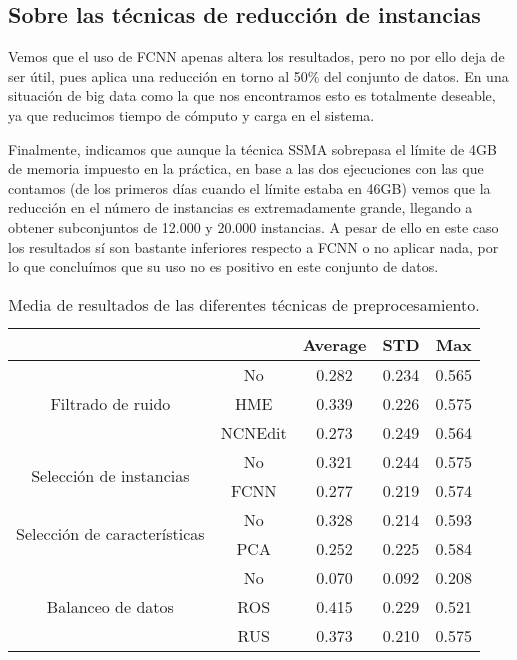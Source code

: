 \subsection{Sobre las técnicas de reducción de instancias}

Vemos que el uso de FCNN apenas altera los resultados, pero no por ello deja de ser útil, pues aplica una reducción en torno al 50\% del conjunto de datos. En una situación de big data como la que nos encontramos esto es totalmente deseable, ya que reducimos tiempo de cómputo y carga en el sistema.

\vspace{\baselineskip}

Finalmente, indicamos que aunque la técnica SSMA sobrepasa el límite de 4GB de memoria impuesto en la práctica, en base a las dos ejecuciones con las que contamos (de los primeros días cuando el límite estaba en 46GB) vemos que la reducción en el número de instancias es extremadamente grande, llegando a obtener subconjuntos de 12.000 y 20.000 instancias.
A pesar de ello en este caso los resultados sí son bastante inferiores respecto a FCNN o no aplicar nada, por lo que concluímos que su uso no es positivo en este conjunto de datos.

\begin{table}
    \centering
    \begin{tabular}{cc|c|c|c|}
    \cline{3-5}
    \multicolumn{1}{l}{\textbf{}} & \textbf{} & \multicolumn{1}{c|}{\textbf{Average}} & \multicolumn{1}{c|}{\textbf{STD}} & \textbf{Max} \\ \hline
    \multicolumn{1}{|c|}{\multirow{3}{*}{Filtrado de ruido}}       & No        & 0.282  & 0.234
    & 0.565    \\ \cline{2-5} 
    \multicolumn{1}{|c|}{}  & HME       & 0.339   & 0.226    & 0.575        \\ \cline{2-5} 
    \multicolumn{1}{|c|}{}  & NCNEdit   & 0.273   & 0.249    & 0.564        \\ \hline
    \multicolumn{1}{|c|}{\multirow{2}{*}{Selección de instancias}} & No        & 0.321  & 0.244    & 0.575        \\ \cline{2-5} 
    \multicolumn{1}{|c|}{}  & FCNN      & 0.277   & 0.219    & 0.574        \\ \hline
    \multicolumn{1}{|c|}{\multirow{2}{*}{Selección de características}} & No        & 0.328  & 0.214    & 0.593        \\ \cline{2-5} 
    \multicolumn{1}{|c|}{}  & PCA      & 0.252    & 0.225    & 0.584        \\ \hline
    \multicolumn{1}{|c|}{\multirow{3}{*}{Balanceo de datos}}       & No        & 0.070  & 0.092    & 0.208        \\ \cline{2-5} 
    \multicolumn{1}{|c|}{}  & ROS       & 0.415   & 0.229    & 0.521        \\ \cline{2-5} 
    \multicolumn{1}{|c|}{}  & RUS       & 0.373   & 0.210    & 0.575        \\ \hline
    \end{tabular}
    \caption{Media de resultados de las diferentes técnicas de preprocesamiento.}
    \label{avg}
\end{table}

